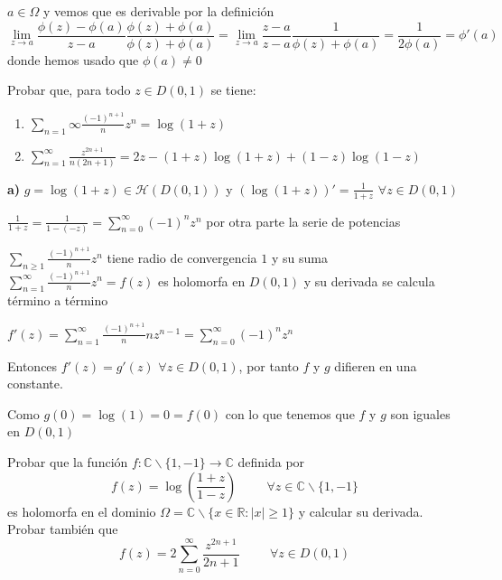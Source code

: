 \begin{sol}
$a\in\Omega$ y vemos que es derivable por la definición
$$\lim_{z\rightarrow a} \frac{\phi(z)-\phi(a)}{z-a} \frac{\phi(z)+\phi(a)}{\phi(z)+\phi(a)} = \lim_{z\rightarrow a} \frac{z-a}{z-a} \frac{1}{\phi(z)+\phi(a)} = \frac{1}{2\phi(a)} = \phi '(a)$$
donde hemos usado que $\phi(a)\not = 0$

\end{sol}



\begin{ejer}
	Probar que, para todo $z \in D(0, 1)$ se tiene:
	\begin{enumerate}[label=(\alph*)]
		\item $\sum_{n=1}{\infty} \frac{(-1)^{n+1}}{n} z^n = \log(1+z)$
		\item $\sum_{n=1}^{\infty} \frac{z^{2n+1}}{n(2n+1)} = 2z-(1+z)\log(1+z)+(1-z)\log(1-z)$
	\end{enumerate}
\end{ejer}

\begin{sol}

\textbf{a)}
$g = \log (1+z) \in\mathcal{H}(D(0,1))$ y $(\log (1+z))' = \frac{1}{1+z}$ $\forall z\in D(0,1)$

$\frac{1}{1+z} = \frac{1}{1-(-z)} = \sum_{n=0}^{\infty} (-1)^n z^n$
por otra parte la serie de potencias 

$\sum_{n\geq 1} \frac{(-1)^{n+1}}{n} z^n$ tiene radio de convergencia $1$
y su suma $\sum_{n=1}^{\infty} \frac{(-1)^{n+1}}{n} z^n = f(z)$ es holomorfa en $D(0,1)$ y su derivada se calcula término a término

$f'(z) = \sum_{n=1}^{\infty} \frac{(-1)^{n+1}}{n} n z^{n-1} = \sum_{n=0}^{\infty} (-1)^{n}z^{n}$

Entonces $f'(z) = g'(z)$ $\forall z\in D(0,1)$, por tanto $f$ y $g$ difieren en una constante.

Como $g(0) = \log(1) = 0 = f(0)$
con lo que tenemos que $f$ y $g$ son iguales en $D(0,1)$

\end{sol}




\begin{ejer}
	Probar que la función $f:\mathbb{C}\backslash\{1,-1\}\rightarrow\mathbb{C}$ definida por
	$$ f(z) = \log\left( \frac{1+z}{1-z} \right) \hspace{1cm} \forall z\in\mathbb{C}\backslash\{1,-1\} $$
	es holomorfa en el dominio $\Omega = \mathbb{C}\backslash\{ x\in\mathbb{R} : |x|\geq 1 \}$ y calcular su derivada. Probar también que
	$$ f(z) = 2\sum_{n=0}^{\infty} \frac{z^{2n+1}}{2n+1} \hspace{1cm} \forall z\in D(0,1) $$
\end{ejer}


